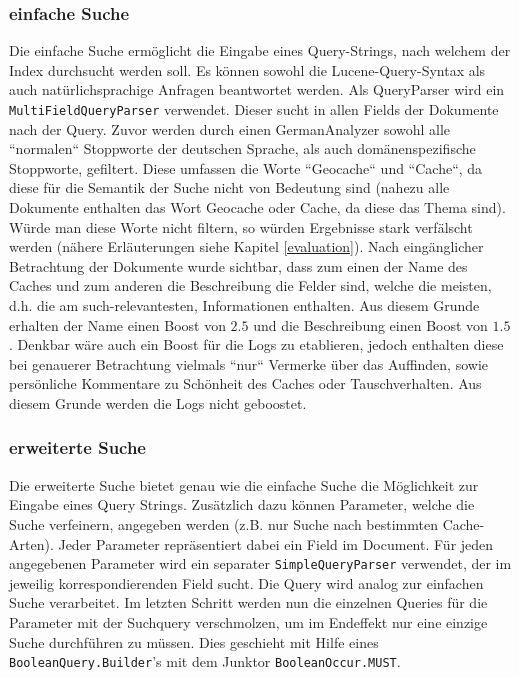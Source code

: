 \documentclass[11pt,a4paper]{scrreprt}
\renewcommand\emph[1]{\colorbox{light-gray}{\texttt{#1}}}
\begin{document}
\subsubsection{einfache Suche}
Die einfache Suche ermöglicht die Eingabe eines Query-Strings, nach welchem der Index durchsucht werden soll. Es können sowohl die Lucene-Query-Syntax als auch natürlichsprachige Anfragen beantwortet werden. Als QueryParser wird ein \emph{MultiFieldQueryParser} verwendet. Dieser sucht in allen Fields der Dokumente nach der Query. Zuvor werden durch einen GermanAnalyzer sowohl alle ``normalen`` Stoppworte der deutschen Sprache, als auch domänenspezifische Stoppworte, gefiltert. Diese umfassen die Worte ``Geocache`` und ``Cache``, da diese für die Semantik der Suche nicht von Bedeutung sind (nahezu alle Dokumente enthalten das Wort Geocache oder Cache, da diese das Thema sind). Würde man diese Worte nicht filtern, so würden Ergebnisse stark verfälscht werden (nähere Erläuterungen siehe Kapitel \ref{evaluation}). Nach eingänglicher Betrachtung der Dokumente wurde sichtbar, dass zum einen der Name des Caches und zum anderen die Beschreibung die Felder sind, welche die meisten, d.h. die am such-relevantesten, Informationen enthalten. Aus diesem Grunde erhalten der Name einen Boost von $2.5$ und die Beschreibung einen Boost von $1.5$. Denkbar wäre auch ein Boost für die Logs zu etablieren, jedoch enthalten diese bei genauerer Betrachtung vielmals ``nur`` Vermerke über das Auffinden, sowie persönliche Kommentare zu Schönheit des Caches oder Tauschverhalten. Aus diesem Grunde werden die Logs nicht geboostet.

\subsubsection{erweiterte Suche}
Die erweiterte Suche bietet genau wie die einfache Suche die Möglichkeit zur Eingabe eines Query Strings. Zusätzlich dazu können Parameter, welche die Suche verfeinern, angegeben werden (z.B. nur Suche nach bestimmten Cache-Arten). Jeder Parameter repräsentiert dabei ein Field im Document. Für jeden angegebenen Parameter wird ein separater \emph{SimpleQueryParser} verwendet, der im jeweilig korrespondierenden Field sucht. Die Query wird analog zur einfachen Suche verarbeitet. Im letzten Schritt werden nun die einzelnen Queries für die Parameter mit der Suchquery verschmolzen, um im Endeffekt nur eine einzige Suche durchführen zu müssen. Dies geschieht mit Hilfe eines \emph{BooleanQuery.Builder}'s mit dem Junktor \emph{BooleanOccur.MUST}.
\end{document}
